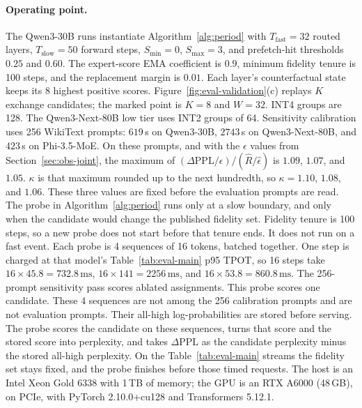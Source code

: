 \paragraph{Operating point.}
The Qwen3-30B runs instantiate Algorithm~\ref{alg:period} with \(T_{\mathrm{fast}}=32\) routed layers, \(T_{\mathrm{slow}}=50\) forward steps, \(S_{\min}=0\), \(S_{\max}=3\), and prefetch-hit thresholds \(0.25\) and \(0.60\).
The expert-score EMA coefficient is \(0.9\), minimum fidelity tenure is 100 steps, and the replacement margin is \(0.01\).
Each layer's counterfactual state keeps its 8 highest positive scores.
Figure~\ref{fig:eval-validation}(c) replays \(K\) exchange candidates; the marked point is \(K=8\) and \(W=32\).
INT4 groups are 128. The Qwen3-Next-80B low tier uses INT2 groups of 64.
Sensitivity calibration uses 256 WikiText prompts: \(619\)\,s on Qwen3-30B, \(2743\)\,s on Qwen3-Next-80B, and \(423\)\,s on Phi-3.5-MoE.
On these prompts, and with the \(\epsilon\) values from Section~\ref{sec:obs-joint}, the maximum of \((\Delta\mathrm{PPL}/\epsilon)/(\widehat R/\widehat\epsilon)\) is \(1.09\), \(1.07\), and \(1.05\). \(\kappa\) is that maximum rounded up to the next hundredth, so \(\kappa=1.10\), \(1.08\), and \(1.06\). These three values are fixed before the evaluation prompts are read.
The probe in Algorithm~\ref{alg:period} runs only at a slow boundary, and only when the candidate would change the published fidelity set. Fidelity tenure is 100 steps, so a new probe does not start before that tenure ends. It does not run on a fast event. Each probe is 4 sequences of 16 tokens, batched together. One step is charged at that model's Table~\ref{tab:eval-main} p95 TPOT, so 16 steps take \(16\times 45.8=732.8\,\mathrm{ms}\), \(16\times 141=2256\,\mathrm{ms}\), and \(16\times 53.8=860.8\,\mathrm{ms}\). The 256-prompt sensitivity pass scores ablated assignments. This probe scores one candidate. These 4 sequences are not among the 256 calibration prompts and are not evaluation prompts. Their all-high log-probabilities are stored before serving. The probe scores the candidate on these sequences, turns that score and the stored score into perplexity, and takes \(\Delta\mathrm{PPL}\) as the candidate perplexity minus the stored all-high perplexity. On the Table~\ref{tab:eval-main} streams the fidelity set stays fixed, and the probe finishes before those timed requests.
The host is an Intel Xeon Gold 6338 with 1\,TB of memory; the GPU is an RTX A6000 (48\,GB), on PCIe, with PyTorch 2.10.0+cu128 and Transformers 5.12.1.
